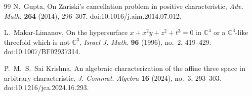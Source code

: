 \documentclass[11pt]{amsart}
\theoremstyle{definition}
\begin{document}
\begin{thebibliography}{99}
 N.~Gupta, On Zariski's cancellation problem in positive characteristic, \emph{Adv. Math.} \textbf{264} (2014), 296--307. doi:10.1016/j.aim.2014.07.012.

 L.~Makar-Limanov, On the hypersurface $x+x^2y+z^2+t^3=0$ in $\mathbb C^4$ or a $\mathbb C^3$-like threefold which is not $\mathbb C^3$, \emph{Israel J. Math.} \textbf{96} (1996), no.~2, 419--429. doi:10.1007/BF02937314.

 P.~M.~S.~Sai Krishna, An algebraic characterization of the affine three space in arbitrary characteristic, \emph{J. Commut. Algebra} \textbf{16} (2024), no.~3, 293--303. doi:10.1216/jca.2024.16.293.

\end{thebibliography}
\end{document}

